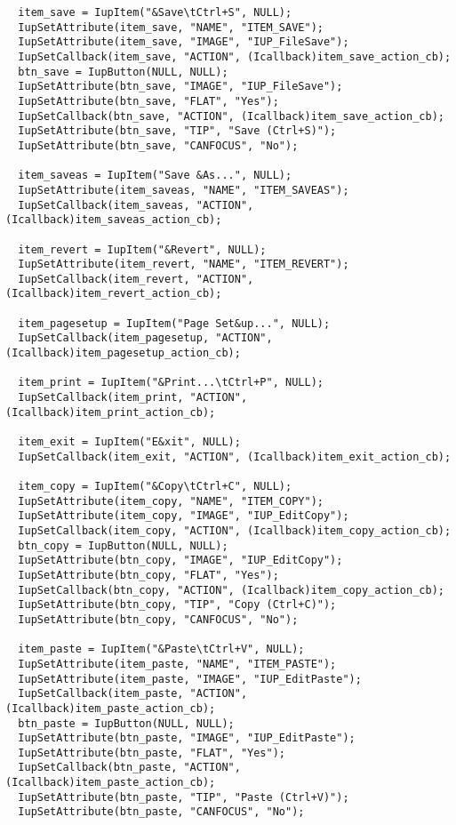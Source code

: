 \documentclass{ctexart}
\begin{document}
\begin{lstlisting}
  item_save = IupItem("&Save\tCtrl+S", NULL);
  IupSetAttribute(item_save, "NAME", "ITEM_SAVE");
  IupSetAttribute(item_save, "IMAGE", "IUP_FileSave");
  IupSetCallback(item_save, "ACTION", (Icallback)item_save_action_cb);
  btn_save = IupButton(NULL, NULL);
  IupSetAttribute(btn_save, "IMAGE", "IUP_FileSave");
  IupSetAttribute(btn_save, "FLAT", "Yes");
  IupSetCallback(btn_save, "ACTION", (Icallback)item_save_action_cb);
  IupSetAttribute(btn_save, "TIP", "Save (Ctrl+S)");
  IupSetAttribute(btn_save, "CANFOCUS", "No");

  item_saveas = IupItem("Save &As...", NULL);
  IupSetAttribute(item_saveas, "NAME", "ITEM_SAVEAS");
  IupSetCallback(item_saveas, "ACTION", (Icallback)item_saveas_action_cb);

  item_revert = IupItem("&Revert", NULL);
  IupSetAttribute(item_revert, "NAME", "ITEM_REVERT");
  IupSetCallback(item_revert, "ACTION", (Icallback)item_revert_action_cb);

  item_pagesetup = IupItem("Page Set&up...", NULL);
  IupSetCallback(item_pagesetup, "ACTION", (Icallback)item_pagesetup_action_cb);

  item_print = IupItem("&Print...\tCtrl+P", NULL);
  IupSetCallback(item_print, "ACTION", (Icallback)item_print_action_cb);

  item_exit = IupItem("E&xit", NULL);
  IupSetCallback(item_exit, "ACTION", (Icallback)item_exit_action_cb);

  item_copy = IupItem("&Copy\tCtrl+C", NULL);
  IupSetAttribute(item_copy, "NAME", "ITEM_COPY");
  IupSetAttribute(item_copy, "IMAGE", "IUP_EditCopy");
  IupSetCallback(item_copy, "ACTION", (Icallback)item_copy_action_cb);
  btn_copy = IupButton(NULL, NULL);
  IupSetAttribute(btn_copy, "IMAGE", "IUP_EditCopy");
  IupSetAttribute(btn_copy, "FLAT", "Yes");
  IupSetCallback(btn_copy, "ACTION", (Icallback)item_copy_action_cb);
  IupSetAttribute(btn_copy, "TIP", "Copy (Ctrl+C)");
  IupSetAttribute(btn_copy, "CANFOCUS", "No");

  item_paste = IupItem("&Paste\tCtrl+V", NULL);
  IupSetAttribute(item_paste, "NAME", "ITEM_PASTE");
  IupSetAttribute(item_paste, "IMAGE", "IUP_EditPaste");
  IupSetCallback(item_paste, "ACTION", (Icallback)item_paste_action_cb);
  btn_paste = IupButton(NULL, NULL);
  IupSetAttribute(btn_paste, "IMAGE", "IUP_EditPaste");
  IupSetAttribute(btn_paste, "FLAT", "Yes");
  IupSetCallback(btn_paste, "ACTION", (Icallback)item_paste_action_cb);
  IupSetAttribute(btn_paste, "TIP", "Paste (Ctrl+V)");
  IupSetAttribute(btn_paste, "CANFOCUS", "No");


\end{lstlisting}
\end{document}
